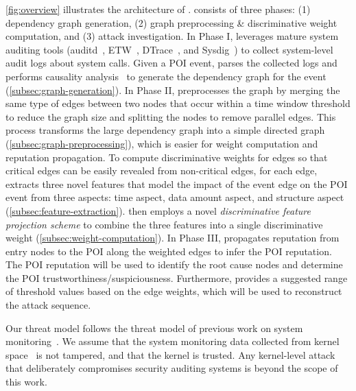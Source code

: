 \cref{fig:overview} illustrates the architecture of \tool. 
\tool consists of three phases: (1) dependency graph generation, (2) graph preprocessing \& discriminative weight computation, and (3) attack investigation.
In Phase I, 
\tool leverages mature system auditing tools (\eg auditd~\cite{auditd}, ETW~\cite{etw}, DTrace~\cite{dtrace}, and Sysdig~\cite{sysdig}) to collect system-level audit logs about system calls.
Given a POI event, \tool parses the collected logs and performs causality analysis~\cite{backtracking,backtracking2} to generate the dependency graph for the event (\cref{subsec:graph-generation}).
%
In Phase II, \tool preprocesses the graph by merging the same type of edges between two nodes that occur within a time window threshold to reduce the graph size and splitting the nodes to remove parallel edges. 
This process transforms the large dependency graph into a simple directed graph (\cref{subsec:graph-preprocessing}), which is easier for weight computation and reputation propagation.
To compute discriminative weights for edges so that critical edges can be easily revealed from non-critical edges,
for each edge, \tool extracts three novel features that model the 
impact of the event edge on the POI event
from three aspects: time aspect, data amount aspect, and structure aspect (\cref{subsec:feature-extraction}). 
\tool then employs a novel 
\emph{discriminative feature projection scheme}
to combine the three features into a single discriminative weight (\cref{subsec:weight-computation}).
%
%
In Phase III, \tool propagates reputation from entry nodes to the POI along the weighted edges to infer the POI reputation.
The 
POI reputation will be used to identify the root cause nodes and determine the POI trustworthiness/suspiciousness. 
Furthermore, \tool provides a suggested range of threshold values based on the edge weights, which will be used to reconstruct the attack sequence.





Our threat model follows the threat model of previous work on system monitoring~\cite{backtracking,backtracking2,loggc,trustkernel,gao2018aiql,gao2018saql,liu2018priotracker,hassan2019nodoze}. 
We assume that the system monitoring data collected from kernel space~\cite{auditd,etw,dtrace,sysdig} is not tampered, and that the kernel is trusted.
Any kernel-level attack that deliberately compromises security auditing systems is beyond the scope of this work.



